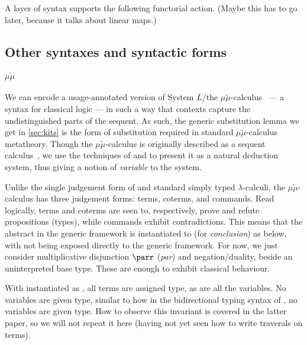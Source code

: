 
A layer of syntax supports the following functorial action.
{\color{red}(Maybe this has to go later, because it talks about linear maps.)}


\subsection{Other syntaxes and syntactic forms}

\paragraph{$\mu\tilde\mu$}
We can encode a usage-annotated version of System $L$/the
$\mu\tilde\mu$-calculus~\cite{CH00} --- a syntax for classical logic --- in
such a way that contexts capture the undistinguished parts of the sequent.
As such, the generic substitution lemma we get in \cref{sec:kits} is the form
of substitution required in standard $\mu\tilde\mu$-calculus metatheory.
Though the $\mu\tilde\mu$-calculus is originally described as a sequent
calculus~\cite{CH00}, we use the techniques of
\citet[p.~12]{herbelin-hab} and \citet{LC06} to present it as a natural
deduction system, thus giving a notion of \emph{variable} to the system.

Unlike the single judgement form of \name{} and standard simply typed
$\lambda$-calculi, the $\mu\tilde\mu$-calculus has three judgement forms:
terms, coterms, and commands.
Read logically, terms and coterms are seen to, respectively, prove and refute
propositions (types), while commands exhibit contradictions.
This means that the abstract  in the generic framework is
instantiated to  (for \emph{conclusion}) as below, with
 not being exposed directly to the generic framework.
For now, we just consider multiplicative disjunction $\parr$ (\emph{par}) and
negation/duality, beside an uninterpreted base type.
These are enough to exhibit classical behaviour.

\begin{minipage}[t]{0.5\textwidth}
  \centering
\end{minipage}
\begin{minipage}[t]{0.5\textwidth}
  \centering
\end{minipage}

With  instantiated as , all terms are assigned
 type, as are all the variables.
No variables are given  type, similar to how in
the bidirectional typing syntax of \citet[p.~25]{AACMM20}, no variables are
given  type.
How to observe this invariant is covered in the latter paper, so we will not
repeat it here (having not yet seen how to write traverals on terms).

